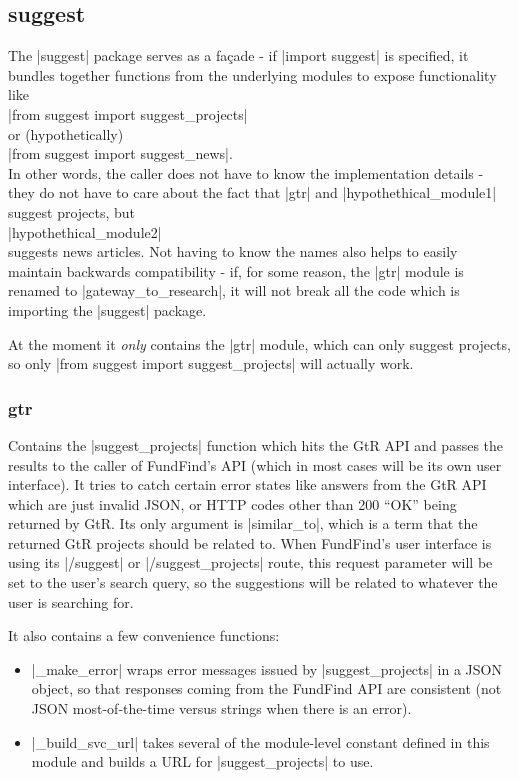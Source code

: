 \subsection{suggest}
\label{design-suggest}
The |suggest| package serves as a façade - if |import suggest| is specified, it bundles together functions from the underlying modules to expose functionality like
\\|from suggest import suggest_projects|
\\or (hypothetically)
\\|from suggest import suggest_news|.
\\In other words, the caller does not have to know the implementation details - they do not have to care about the fact that |gtr| and |hypothethical_module1| suggest projects, but
\\|hypothethical_module2| 
\\suggests news articles. Not having to know the names also helps to easily maintain backwards compatibility - if, for some reason, the |gtr| module is renamed to |gateway_to_research|, it will not break all the code which is importing the |suggest| package.

At the moment it \emph{only} contains the |gtr| module, which can only suggest projects, so only |from suggest import suggest_projects| will actually work.

\subsubsection{gtr}
Contains the |suggest_projects| function which hits the GtR API and passes the results to the caller of FundFind's API (which in most cases will be its own user interface). It tries to catch certain error states like answers from the GtR API which are just invalid JSON, or HTTP codes other than 200 ``OK'' being returned by GtR. Its only argument is |similar_to|, which is a term that the returned GtR projects should be related to. When FundFind's user interface is using its |/suggest| or |/suggest_projects| route, this request parameter will be set to the user's search query, so the suggestions will be related to whatever the user is searching for.

It also contains a few convenience functions:
\begin{itemize}
\item |_make_error| wraps error messages issued by |suggest_projects| in a JSON object, so that responses coming from the FundFind API are consistent (not JSON most-of-the-time versus strings when there is an error).
\item |_build_svc_url| takes several of the module-level constant defined in this module and builds a URL for |suggest_projects| to use.
\end{itemize}

